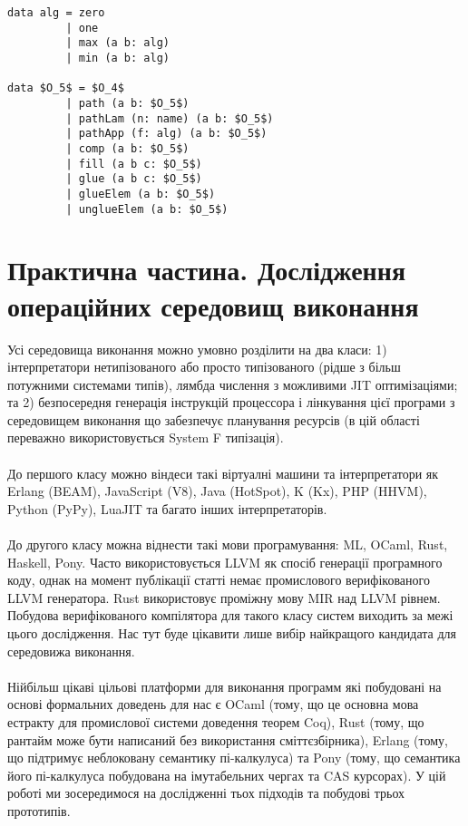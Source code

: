\begin{lstlisting}[mathescape=true]
data alg = zero
         | one
         | max (a b: alg)
         | min (a b: alg)

data $O_5$ = $O_4$
         | path (a b: $O_5$)
         | pathLam (n: name) (a b: $O_5$)
         | pathApp (f: alg) (a b: $O_5$)
         | comp (a b: $O_5$)
         | fill (a b c: $O_5$)
         | glue (a b c: $O_5$)
         | glueElem (a b: $O_5$)
         | unglueElem (a b: $O_5$)
\end{lstlisting}

\newpage
\section{Практична частина. Дослідження операційних середовищ виконання}

Усі середовища виконання можно умовно розділити на два класи:
1) інтерпретатори нетипізованого або просто
типізованого (рідше з більш потужними системами типів),
лямбда числення з можливими JIT оптимізаціями; та 2)
безпосередня генерація інструкцій процессора і лінкування цієї програми з
середовищем виконання що забезпечує планування ресурсів
(в цій області переважно використовується System F типізація).

\paragraph{}
До першого класу можно віндеси такі віртуалні машини та інтерпретатори як
Erlang (BEAM), JavaScript (V8), Java (HotSpot), K (Kx), PHP (HHVM), Python (PyPy), LuaJIT
та багато інших інтерпретаторів.

\paragraph{}
До другого класу можна віднести такі мови програмування: ML, OCaml, Rust,
Haskell, Pony. Часто використовується LLVM як спосіб генерації програмного коду,
однак на момент публікації статті немає промислового верифікованого LLVM генератора.
Rust використовує проміжну мову MIR над LLVM рівнем. Побудова верифікованого компілятора
для такого класу систем виходить за межі цього дослідження. Нас тут буде цікавити
лише вибір найкращого кандидата для середовижа виконання.

\paragraph{}
Нійбільш цікаві цільові платформи для виконання программ
які побудовані на основі формальних доведень для нас є OCaml (тому,
що це основна мова естракту для промислової системи доведення теорем Coq),
Rust (тому, що рантайм може бути написаний без використання сміттєзбірника),
Erlang (тому, що підтримує неблоковану семантику пі-калкулуса)
та Pony (тому, що семантика його пі-калкулуса побудована на імутабельних чергах та CAS курсорах).
У цій роботі ми зосередимося на дослідженні тьох підходів
та побудові трьох прототипів.



